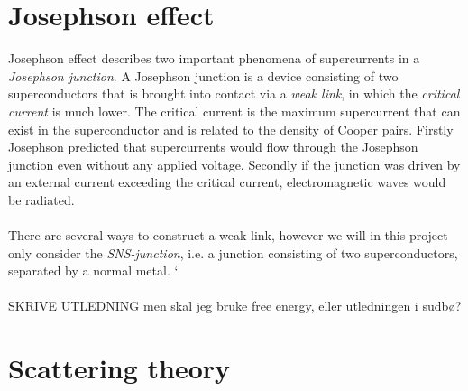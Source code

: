 \section{Josephson effect}
Josephson effect describes two important phenomena of supercurrents in a \textit{Josephson junction}. A Josephson junction is a device consisting of two superconductors that is brought into contact via a \textit{weak link}, in which the \textit{critical current} is much lower. The critical current is the maximum supercurrent that can exist in the superconductor and is related to the density of Cooper pairs. 
Firstly Josephson predicted \cite{josephson62} that supercurrents would flow through the Josephson junction even without any applied voltage. Secondly if the junction was driven by an external current exceeding the critical current, electromagnetic waves would be radiated.
\\
\\
There are several ways to construct a weak link, however we will in this project only consider the \textit{SNS-junction}, i.e. a junction consisting of two superconductors, separated by a normal metal.
`\\
\\
SKRIVE UTLEDNING
men skal jeg bruke free energy, eller utledningen i sudbø?

\section{Scattering theory}


